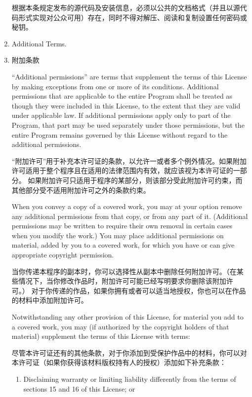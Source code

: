 \documentclass[11pt]{article}
\begin{document}
\begin{enumerate}
        根据本条规定发布的源代码及安装信息，必须以公共的文档格式（并且以源代码形式实现对公众可用）存在，同时不得对解压、阅读和复制设置任何密码或秘钥。

  \item Additional Terms.
  \item 附加条款

        ``Additional permissions'' are terms that supplement the terms of this
        License by making exceptions from one or more of its conditions.
        Additional permissions that are applicable to the entire Program shall
        be treated as though they were included in this License, to the extent
        that they are valid under applicable law.  If additional permissions
        apply only to part of the Program, that part may be used separately
        under those permissions, but the entire Program remains governed by
        this License without regard to the additional permissions.

        “附加许可”用于补充本许可证的条款，以允许一或者多个例外情况。如果附加许可适用于整个程序且在适用的法律范围内有效，就应该视为本许可证的一部分。
        如果附加许可只适用于程序的某部分，则该部分受此附加许可约束，而其他部分受不适用附加许可之外的条款约束。

        When you convey a copy of a covered work, you may at your option
        remove any additional permissions from that copy, or from any part of
        it.  (Additional permissions may be written to require their own
        removal in certain cases when you modify the work.)  You may place
        additional permissions on material, added by you to a covered work,
        for which you have or can give appropriate copyright permission.

        当你传递本程序的副本时，你可以选择性从副本中删除任何附加许可。（在某些情况下，当你修改作品时，附加许可可能已经写明要求你删除该附加许可。）
        对于你传递的作品，如果你拥有或者可以适当地授权，你也可以在作品的材料中添加附加许可。

        Notwithstanding any other provision of this License, for material you
        add to a covered work, you may (if authorized by the copyright holders of
        that material) supplement the terms of this License with terms:

        尽管本许可证还有的其他条款，对于你添加到受保护作品中的材料，你可以对本许可证（如果你获得该材料版权持有人的授权）添加如下补充条款：

        \begin{enumerate}
          \item Disclaiming warranty or limiting liability differently from the
                terms of sections 15 and 16 of this License; or


\end{enumerate}
\end{enumerate}
\end{document}
